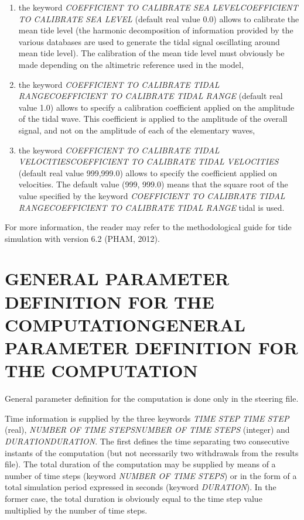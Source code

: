 \documentclass{article} %
\begin{document}
\begin{enumerate}
\item  the keyword \textit{COEFFICIENT TO CALIBRATE SEA LEVELCOEFFICIENT TO CALIBRATE SEA LEVEL} (default real value 0.0) allows to calibrate the mean tide level (the harmonic decomposition of information provided by the various databases are used to generate the tidal signal oscillating around mean tide level). The calibration of the mean tide level must obviously be made depending on the altimetric reference used in the model,

\item  the keyword \textit{COEFFICIENT TO CALIBRATE TIDAL RANGECOEFFICIENT TO CALIBRATE TIDAL RANGE} (default real value 1.0) allows to specify a calibration coefficient applied on the amplitude of the tidal wave. This coefficient is applied to the amplitude of the overall signal, and not on the amplitude of each of the elementary waves,

\item  the keyword \textit{COEFFICIENT TO CALIBRATE TIDAL VELOCITIESCOEFFICIENT TO CALIBRATE TIDAL VELOCITIES} (default real value 999,999.0) allows to specify the coefficient applied on velocities. The default value (999, 999.0) means that the square root of the value specified by the keyword \textit{COEFFICIENT TO CALIBRATE TIDAL RANGECOEFFICIENT TO CALIBRATE TIDAL RANGE} tidal is used.
\end{enumerate}

 For more information, the reader may refer to the methodological guide for tide simulation with version 6.2 (PHAM, 2012).




\section{  GENERAL PARAMETER DEFINITION FOR THE COMPUTATIONGENERAL PARAMETER DEFINITION FOR THE COMPUTATION}

 General parameter definition for the computation is done only in the steering file.

 Time information is supplied by the three keywords \textit{TIME STEP} \textit{TIME STEP} (real), \textit{NUMBER OF TIME STEPSNUMBER OF TIME STEPS }(integer) and \textit{DURATIONDURATION}. The first defines the time separating two consecutive instants of the computation (but not necessarily two withdrawals from the results file). The total duration of the computation may be supplied by means of a number of time steps (keyword \textit{NUMBER OF TIME STEPS}) or in the form of a total simulation period expressed in seconds (keyword \textit{DURATION}). In the former case, the total duration is obviously equal to the time step value multiplied by the number of time steps.
\end{document}
